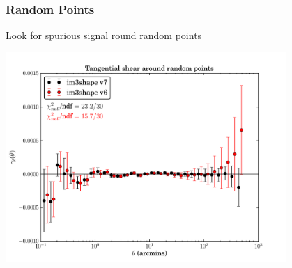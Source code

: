\documentclass{beamer}
\begin{document}
\frame
{
    \frametitle{Random Points}

    Look for spurious signal round random points

    \begin{center}
        \includegraphics[width=0.8\textwidth]{random_points_v6_v7.pdf}
    \end{center}
}
\end{document}
